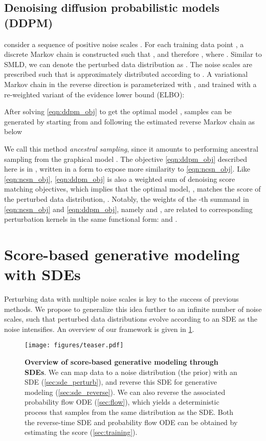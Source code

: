 \documentclass{article} \usepackage{iclr2021_conference,times}
\begin{document}
\subsection{Denoising diffusion probabilistic models (DDPM)}\label{sec:ddpm}
\citet{sohl2015deep,ho2020denoising} consider a sequence of positive noise scales . For each training data point , a discrete Markov chain  is constructed such that , and therefore , where . Similar to SMLD, we can denote the perturbed data distribution as . The noise scales are prescribed such that  is approximately distributed according to . A variational Markov chain in the reverse direction is parameterized with , and trained with a re-weighted variant of the evidence lower bound (ELBO):

After solving \cref{eqn:ddpm_obj} to get the optimal model , samples can be generated by starting from  and following the estimated reverse Markov chain as below

We call this method \emph{ancestral sampling}, since it amounts to performing ancestral sampling from the graphical model . The objective \cref{eqn:ddpm_obj} described here is  in \citet{ho2020denoising}, written in a form to expose more similarity to \cref{eqn:ncsn_obj}. 
Like \cref{eqn:ncsn_obj}, \cref{eqn:ddpm_obj} is also a weighted sum of denoising score matching objectives, which implies that the optimal model, , matches the score of the perturbed data distribution, . Notably, the weights of the -th summand in \cref{eqn:ncsn_obj} and \cref{eqn:ddpm_obj}, namely  and , are related to corresponding perturbation kernels in the same functional form:  and . 

 \section{Score-based generative modeling with SDEs}
Perturbing data with multiple noise scales is key to the success of previous methods. We propose to generalize this idea further to an infinite number of noise scales, such that perturbed data distributions evolve according to an SDE as the noise intensifies. An overview of our framework is given in \cref{fig:toy}.

\begin{figure}
    \centering
    \texttt{[image: figures/teaser.pdf]}
    \caption{\textbf{Overview of score-based generative modeling through SDEs}. We can map data to a noise distribution (the prior) with an SDE (\cref{sec:sde_perturb}), and reverse this SDE for generative modeling (\cref{sec:sde_reverse}). We can also reverse the associated probability flow ODE (\cref{sec:flow}), which yields a deterministic process that samples from the same distribution as the SDE. Both the reverse-time SDE and probability flow ODE can be obtained by estimating the score  (\cref{sec:training}).}
    \label{fig:toy}
\end{figure}
\end{document}
